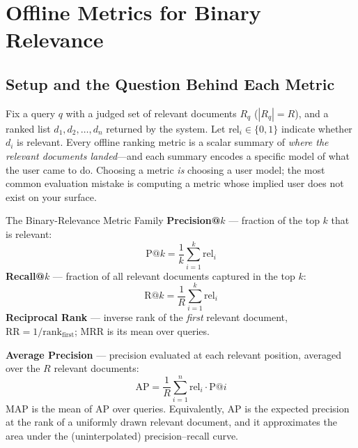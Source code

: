 \section{Offline Metrics for Binary Relevance}
\label{sr:sec:eval_binary_metrics}

\subsection{Setup and the Question Behind Each Metric}

Fix a query $q$ with a judged set of relevant documents $R_q$ ($|R_q| = R$), and a ranked list $d_1, d_2, \ldots, d_n$ returned by the system. Let $\mathrm{rel}_i \in \{0, 1\}$ indicate whether $d_i$ is relevant. Every offline ranking metric is a scalar summary of \textit{where the relevant documents landed}---and each summary encodes a specific model of what the user came to do. Choosing a metric \textit{is} choosing a user model; the most common evaluation mistake is computing a metric whose implied user does not exist on your surface.

\begin{mathresult}{The Binary-Relevance Metric Family}
\textbf{Precision@$k$} --- fraction of the top $k$ that is relevant:
\begin{equation}
\mathrm{P@}k = \frac{1}{k}\sum_{i=1}^{k} \mathrm{rel}_i
\end{equation}
\textbf{Recall@$k$} --- fraction of all relevant documents captured in the top $k$:
\begin{equation}
\mathrm{R@}k = \frac{1}{R}\sum_{i=1}^{k} \mathrm{rel}_i
\end{equation}
\textbf{Reciprocal Rank} --- inverse rank of the \textit{first} relevant document, $\mathrm{RR} = 1/\mathrm{rank}_{\text{first}}$; MRR is its mean over queries.

\textbf{Average Precision} --- precision evaluated at each relevant position, averaged over the $R$ relevant documents:
\begin{equation}
\mathrm{AP} = \frac{1}{R}\sum_{i=1}^{n} \mathrm{rel}_i \cdot \mathrm{P@}i
\label{sr:eq:ap}
\end{equation}
MAP is the mean of AP over queries. Equivalently, AP is the expected precision at the rank of a uniformly drawn relevant document, and it approximates the area under the (uninterpolated) precision--recall curve.
\end{mathresult}

